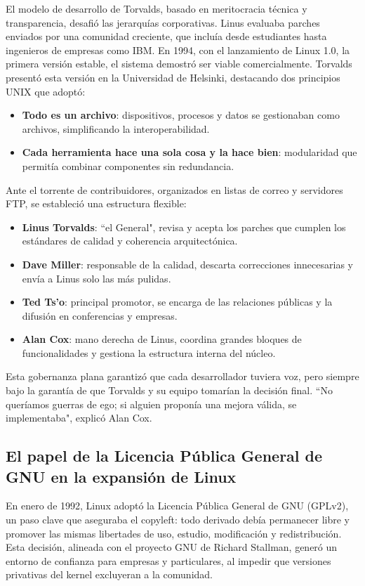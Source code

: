 \documentclass[a4paper,12pt]{article}
\begin{document}
El modelo de desarrollo de Torvalds, basado en meritocracia técnica y
transparencia, desafió las jerarquías corporativas. Linus evaluaba parches
enviados por una comunidad creciente, que incluía desde estudiantes hasta
ingenieros de empresas como IBM. En 1994, con el lanzamiento de Linux 1.0, la
primera versión estable, el sistema demostró ser viable comercialmente. Torvalds
presentó esta versión en la Universidad de Helsinki, destacando dos principios
UNIX que adoptó:
\begin{itemize}
    \item \textbf{Todo es un archivo}: dispositivos, procesos y datos se
    gestionaban como archivos, simplificando la interoperabilidad.     
    \item \textbf{Cada herramienta hace una sola cosa y la hace bien}:
    modularidad que permitía combinar componentes sin redundancia.
\end{itemize}
Ante el torrente de contribuidores, organizados en listas de correo y servidores
FTP, se estableció una estructura flexible:
\begin{itemize}
    \item \textbf{Linus Torvalds}: ``el General", revisa y acepta los parches que
    cumplen los estándares de calidad y coherencia arquitectónica. 
    \item \textbf{Dave Miller}: responsable de la calidad, descarta correcciones
    innecesarias y envía a Linus solo las más pulidas.  
    \item \textbf{Ted Ts’o}: principal promotor, se encarga de las relaciones
    públicas y la difusión en conferencias y empresas.  
    \item \textbf{Alan Cox}: mano derecha de Linus, coordina grandes bloques de
    funcionalidades y gestiona la estructura interna del núcleo.
\end{itemize} 

Esta gobernanza plana garantizó que cada desarrollador tuviera voz, pero siempre
bajo la garantía de que Torvalds y su equipo tomarían la decisión final.  ``No
queríamos guerras de ego; si alguien proponía una mejora válida, se
implementaba", explicó Alan Cox.

\newpage
\subsection{El papel de la Licencia Pública General de GNU en la expansión de Linux}

En enero de 1992, Linux adoptó la Licencia Pública General de GNU (GPLv2), un
paso clave que aseguraba el copyleft: todo derivado debía permanecer libre y
promover las mismas libertades de uso, estudio, modificación y redistribución. 
Esta decisión, alineada con el proyecto GNU de Richard Stallman, generó un
entorno de confianza para empresas y particulares, al impedir que versiones
privativas del kernel excluyeran a la comunidad.
\end{document}
